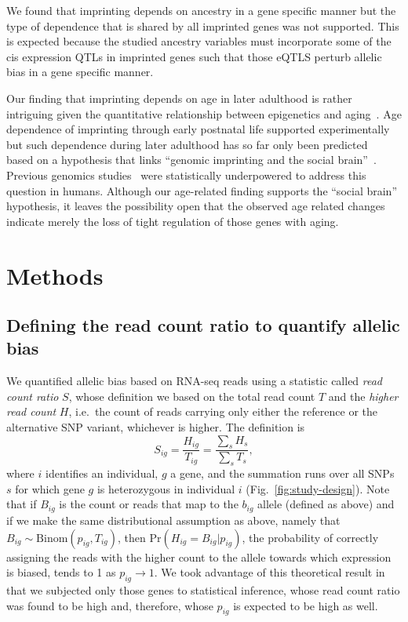 \documentclass[letterpaper]{article}
\begin{document}
We found that imprinting depends on ancestry in a gene
specific manner but the type of dependence that is shared by all imprinted
genes was not supported.  This is expected because the studied
ancestry variables must incorporate some of the cis expression
QTLs in imprinted genes such that those eQTLS perturb allelic bias in a gene
specific manner.

Our finding that imprinting depends on age in later adulthood is rather
intriguing given the quantitative relationship between epigenetics and
aging~\cite{Horvath2013}.  Age dependence of imprinting through early
postnatal life supported experimentally~\cite{Perez2015} but such dependence
during later adulthood has so far only been predicted~\cite{Ubeda2012} based
on a hypothesis that links ``genomic imprinting and the social
brain''~\cite{Isles2006}.  Previous genomics studies~\cite{Baran2015} were
statistically underpowered to address this question in humans.  Although our
age-related finding supports the ``social brain'' hypothesis, it leaves the
possibility open that the observed age related changes indicate merely the
loss of tight regulation of those genes with aging.


\clearpage

\section{Methods}

\subsection{Defining the read count ratio to quantify allelic bias}

We quantified allelic bias based on RNA-seq reads using a statistic called
\emph{read count ratio} \(S\), whose definition we
based on the total read count \(T\) and the \emph{higher read count} \(H\),
i.e.~the count of reads carrying only either the reference or the alternative SNP variant,
whichever is higher.  The
definition is
\begin{equation}
S_{ig} = \frac{H_{ig}}{T_{ig}}= \frac{\sum_s H_s}{\sum_sT_s},
\label{eq:S-definition}
\end{equation}
where \(i\) identifies an individual, \(g\) a gene, and the summation runs
over all SNPs \(s\) for which gene \(g\) is heterozygous in individual \(i\) (Fig.~\ref{fig:study-design}).
Note that if \(B_{ig}\) is the count or reads that map to the \(b_{ig}\) allele
(defined as above) and if we make the same distributional assumption as above, namely that \(B_{ig}\sim
\mathrm{Binom}(p_{ig}, T_{ig})\), then \(\mathrm{Pr}(H_{ig}=B_{ig}|p_{ig})\), the probability of correctly
assigning the reads with the higher count to the allele towards which
expression is biased, tends to 1 as \(p_{ig} \rightarrow 1\).  We took
advantage of this theoretical result in that we subjected only those genes to
statistical inference, whose read count ratio was found to be high and,
therefore, whose \(p_{ig}\) is expected to be high as well.
\end{document}
